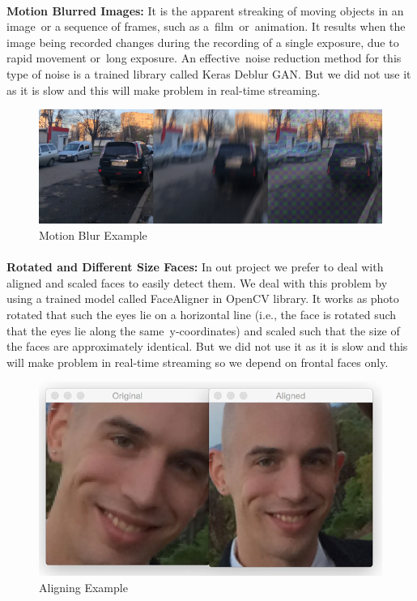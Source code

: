 \paragraph{}
\textbf{Motion Blurred Images:}\newline
It is the apparent streaking of moving objects in an image or a sequence of frames, such as a film or animation. It results when the image being recorded changes during the recording of a single exposure, due to rapid movement or long exposure.\newline
An effective noise reduction method for this type of noise is a trained library called Keras Deblur GAN.\newline
But we did not use it as it is slow and this will make problem in real-time streaming.
\begin{figure}[H]
	\centering
	\includegraphics[width=\linewidth]{motion_blur.png}
	\caption{Motion Blur Example}
\end{figure}
\paragraph{}
\textbf{Rotated and Different Size Faces:}\newline
In out project we prefer to deal with aligned and scaled faces to easily detect them.\newline
We deal with this problem by using a trained model called FaceAligner in OpenCV library.\newline
It works as photo rotated that such the eyes lie on a horizontal line (i.e., the face is rotated such that the eyes lie along the same y-coordinates) and scaled such that the size of the faces are approximately identical.\newline
But we did not use it as it is slow and this will make problem in real-time streaming so we depend on frontal faces only.
\begin{figure}[H]
	\centering
	\includegraphics[width=\linewidth]{aligning.jpg}
	\caption{Aligning Example}
\end{figure}
\newpage
